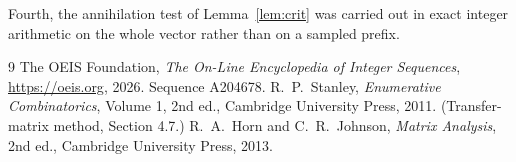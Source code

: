 \documentclass[11pt,a4paper]{article}
\theoremstyle{plain}
\theoremstyle{definition}
\begin{document}
Fourth, the annihilation test of Lemma~\ref{lem:crit} was carried out in exact integer
arithmetic on the whole vector rather than on a sampled prefix.

\begin{thebibliography}{9}
 The OEIS Foundation, \emph{The On-Line Encyclopedia of Integer
Sequences}, \url{https://oeis.org}, 2026. Sequence A204678.
 R.~P.~Stanley, \emph{Enumerative Combinatorics}, Volume 1, 2nd ed.,
Cambridge University Press, 2011. (Transfer-matrix method, Section 4.7.)
 R.~A.~Horn and C.~R.~Johnson, \emph{Matrix Analysis}, 2nd ed., Cambridge
University Press, 2013.
\end{thebibliography}
\end{document}
